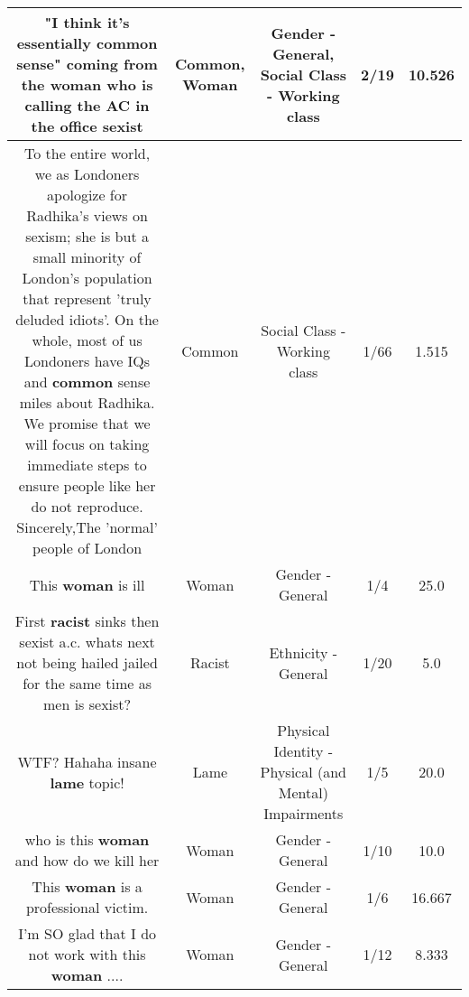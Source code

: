 \documentclass[11pt]{article}
\newlength\mylength
\begin{document}
\begin{center}
\begin{longtable}{|C{.65\mylength}|C{.30\mylength}|C{.12\mylength}|C{.12\mylength}|C{.12\mylength}|}
  \small "I think it's essentially \textbf{common} sense" coming from the \textbf{woman} who is calling the AC in the office sexist\normalsize   & Common, Woman & Gender - General, Social Class - Working class & 2/19 & 10.526 \\  \hline
  \small To the entire world, we as Londoners apologize for Radhika's views on sexism;  she is but a small minority of London's population that represent 'truly deluded idiots'. On the whole, most of us Londoners have IQs and \textbf{common} sense miles about Radhika. We promise that we will focus on taking immediate steps to ensure people like her do not reproduce. Sincerely,The 'normal' people of London\normalsize   & Common & Social Class - Working class & 1/66 & 1.515 \\  \hline
  \small This \textbf{woman} is ill\normalsize   & Woman & Gender - General & 1/4 & 25.0 \\  \hline
  \small First \textbf{racist} sinks then sexist a.c. whats next not being hailed jailed for the same time as men is sexist?\normalsize   & Racist & Ethnicity - General & 1/20 & 5.0 \\  \hline
  \small WTF?   Hahaha insane \textbf{lame} topic!\normalsize   & Lame & Physical Identity - Physical (and Mental) Impairments & 1/5 & 20.0 \\  \hline
  \small who is this \textbf{woman} and how do we kill her\normalsize   & Woman & Gender - General & 1/10 & 10.0 \\  \hline
  \small This \textbf{woman} is a professional victim.\normalsize   & Woman & Gender - General & 1/6 & 16.667 \\  \hline
  \small I'm SO glad that I do not work with this \textbf{woman} ....\normalsize   & Woman & Gender - General & 1/12 & 8.333 \\  \hline

\end{longtable}
\end{center}
\end{document}
